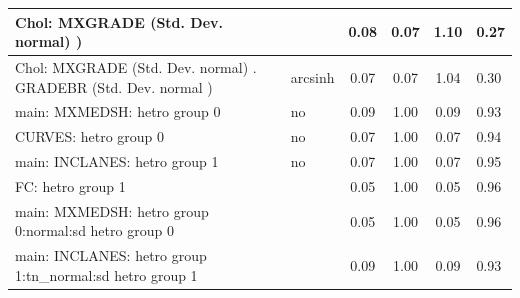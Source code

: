 \begin{table}
\begin{center}
\begin{tabular}{|l|l|c|c|c|l|}
			\hline
			 Chol: MXGRADE (Std. Dev. normal) ) &  & 0.08 & 0.07 & 1.10 & 0.27 \\
			\hline
			 Chol: MXGRADE (Std. Dev. normal) . GRADEBR (Std. Dev.   normal ) & arcsinh & 0.07 & 0.07 & 1.04 & 0.30 \\
			\hline
			main: MXMEDSH: hetro group 0 & no & 0.09 & 1.00 & 0.09 & 0.93 \\
			\hline
			CURVES: hetro group 0 & no & 0.07 & 1.00 & 0.07 & 0.94 \\
			\hline
			main: INCLANES: hetro group 1 & no & 0.07 & 1.00 & 0.07 & 0.95 \\
			\hline
			FC: hetro group 1 &  & 0.05 & 1.00 & 0.05 & 0.96 \\
			\hline
			main: MXMEDSH: hetro group 0:normal:sd  hetro group 0 &  & 0.05 & 1.00 & 0.05 & 0.96 \\
			\hline
			main: INCLANES: hetro group 1:tn_normal:sd  hetro group 1 &  & 0.09 & 1.00 & 0.09 & 0.93 \\
			\hline
		\end{tabular}
	\end{center}
\end{table}